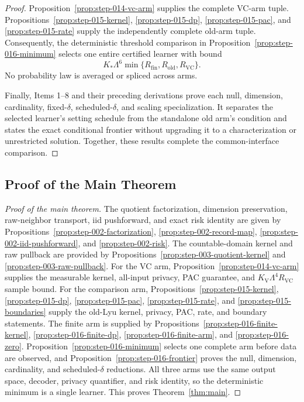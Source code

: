 \begin{proof}
Proposition~\ref{prop:step-014-vc-arm} supplies the complete
VC-arm tuple. Propositions~\ref{prop:step-015-kernel},
\ref{prop:step-015-dp}, \ref{prop:step-015-pac}, and
\ref{prop:step-015-rate} supply the independently complete old-arm tuple.
Consequently, the deterministic threshold comparison in
Proposition~\ref{prop:step-016-minimum} selects one entire certified learner
with bound
\[
 K_*\Lambda^6\min\{R_{\mathrm{fin}},R_{\mathrm{old}},R_{\mathrm{VC}}\}.
\]
No probability law is averaged or spliced across arms.

Finally, Items 1--8 and their preceding derivations prove each null,
dimension, cardinality, fixed-\(\delta\), scheduled-\(\delta\), and scaling
specialization. It separates the selected learner's setting schedule from
the standalone old arm's condition and states the exact conditional frontier
without upgrading it to a characterization or unrestricted solution. Together,
these results complete the common-interface comparison.



\end{proof}

\subsection{Proof of the Main Theorem}\label{app:main-proof}

\begin{proof}[Proof of the main theorem]
The quotient factorization, dimension preservation, raw-neighbor transport,
iid pushforward, and exact risk identity are given by
Propositions~\ref{prop:step-002-factorization},
\ref{prop:step-002-record-map},
\ref{prop:step-002-iid-pushforward}, and
\ref{prop:step-002-risk}. The countable-domain kernel and raw pullback are
provided by Propositions~\ref{prop:step-003-quotient-kernel} and
\ref{prop:step-003-raw-pullback}. For the VC arm,
Proposition~\ref{prop:step-014-vc-arm} supplies the measurable kernel,
all-input privacy, PAC guarantee, and
$K_{\mathrm V}\Lambda^4R_{\mathrm{VC}}$ sample bound. For the comparison
arm, Propositions~\ref{prop:step-015-kernel},
\ref{prop:step-015-dp}, \ref{prop:step-015-pac},
\ref{prop:step-015-rate}, and
\ref{prop:step-015-boundaries} supply the old-Lyu kernel, privacy, PAC,
rate, and boundary statements. The finite arm is supplied by
Propositions~\ref{prop:step-016-finite-kernel},
\ref{prop:step-016-finite-dp},
\ref{prop:step-016-finite-arm}, and
\ref{prop:step-016-zero}. Proposition~\ref{prop:step-016-minimum}
selects one complete arm before data are observed, and
Proposition~\ref{prop:step-016-frontier} proves the null, dimension,
cardinality, and scheduled-\(\delta\) reductions. All three arms use the
same output space, decoder, privacy quantifier, and risk identity, so the
deterministic minimum is a single learner. This proves Theorem~\ref{thm:main}.
\end{proof}
